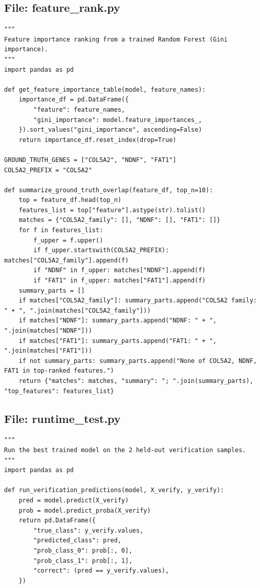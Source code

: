 \documentclass[11pt]{article}
\begin{document}
\subsection*{File: feature\_rank.py}

\begin{lstlisting}[style=pythonstyle]
"""
Feature importance ranking from a trained Random Forest (Gini importance).
"""
import pandas as pd

def get_feature_importance_table(model, feature_names):
    importance_df = pd.DataFrame({
        "feature": feature_names,
        "gini_importance": model.feature_importances_,
    }).sort_values("gini_importance", ascending=False)
    return importance_df.reset_index(drop=True)

GROUND_TRUTH_GENES = ["COL5A2", "NDNF", "FAT1"]
COL5A2_PREFIX = "COL5A2"

def summarize_ground_truth_overlap(feature_df, top_n=10):
    top = feature_df.head(top_n)
    features_list = top["feature"].astype(str).tolist()
    matches = {"COL5A2_family": [], "NDNF": [], "FAT1": []}
    for f in features_list:
        f_upper = f.upper()
        if f_upper.startswith(COL5A2_PREFIX): matches["COL5A2_family"].append(f)
        if "NDNF" in f_upper: matches["NDNF"].append(f)
        if "FAT1" in f_upper: matches["FAT1"].append(f)
    summary_parts = []
    if matches["COL5A2_family"]: summary_parts.append("COL5A2 family: " + ", ".join(matches["COL5A2_family"]))
    if matches["NDNF"]: summary_parts.append("NDNF: " + ", ".join(matches["NDNF"]))
    if matches["FAT1"]: summary_parts.append("FAT1: " + ", ".join(matches["FAT1"]))
    if not summary_parts: summary_parts.append("None of COL5A2, NDNF, FAT1 in top-ranked features.")
    return {"matches": matches, "summary": "; ".join(summary_parts), "top_features": features_list}
\end{lstlisting}

\subsection*{File: runtime\_test.py}

\begin{lstlisting}[style=pythonstyle]
"""
Run the best trained model on the 2 held-out verification samples.
"""
import pandas as pd

def run_verification_predictions(model, X_verify, y_verify):
    pred = model.predict(X_verify)
    prob = model.predict_proba(X_verify)
    return pd.DataFrame({
        "true_class": y_verify.values,
        "predicted_class": pred,
        "prob_class_0": prob[:, 0],
        "prob_class_1": prob[:, 1],
        "correct": (pred == y_verify.values),
    })
\end{lstlisting}
\end{document}
